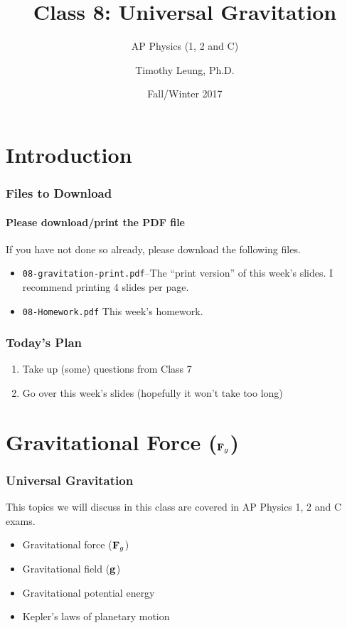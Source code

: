 \documentclass[12pt,compress,aspectratio=169]{beamer}
\title{Class 8: Universal Gravitation}
\subtitle{AP Physics (1, 2 and C)}
\author[TML]{Timothy Leung, Ph.D.}
\institute{Olympiads School}
\date{Fall/Winter 2017}
\newcommand{\mb}[1]{\ensuremath\mathbf{#1}}
\begin{document}
\begin{frame}
  \maketitle
\end{frame}


\section[Intro]{Introduction}

\begin{frame}
  \frametitle{Files to Download}
  \framesubtitle{Please download/print the PDF file}
  If you have not done so already, please download the following files.
  \begin{itemize}
  \item\texttt{08-gravitation-print.pdf}--The ``print version'' of this week's
    slides. I recommend printing 4 slides per page.
  \item\texttt{08-Homework.pdf} This week's homework.
  \end{itemize}
\end{frame}


\begin{frame}
  \frametitle{Today's Plan}
  \begin{enumerate}
  \item Take up (some) questions from Class 7
  \item Go over this week's slides (hopefully it won't take too long)
  \end{enumerate}
\end{frame}



\section[$\mb{F}_g$]{Gravitational Force ($\mb{F}_g$)}
\begin{frame}
  \frametitle{Universal Gravitation}
  This topics we will discuss in this class are covered in AP Physics 1, 2 and
  C exams.
  \begin{itemize}
  \item Gravitational force ($\mb{F}_g$)
  \item Gravitational field ($\mb{g}$)
  \item Gravitational potential energy
  \item Kepler's laws of planetary motion
  \end{itemize}
\end{frame}
\end{document}
